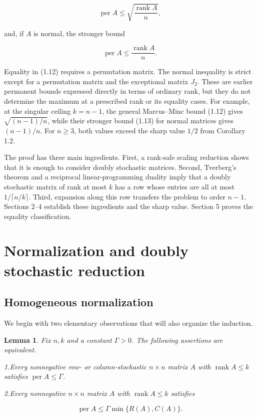 \documentclass[11pt]{article}
\newtheorem{lemma}[theorem]{Lemma}
\theoremstyle{remark}
\begin{document}
\[
 \operatorname{per}A\leq
 \sqrt{\frac{\operatorname{rank}A}{n}},                    \tag{1.12}
\]

and, if \(A\) is normal, the stronger bound

\[
 \operatorname{per}A\leq\frac{\operatorname{rank}A}{n}.  \tag{1.13}
\]

Equality in (1.12) requires a permutation matrix. The normal inequality is
strict except for a permutation matrix and the exceptional matrix \(J_2\).
These are earlier permanent bounds expressed directly in terms of ordinary
rank, but they do not determine the maximum at a prescribed rank or its
equality cases. For example, at the singular ceiling \(k=n-1\), the general
Marcus--Minc bound (1.12) gives \(\sqrt{(n-1)/n}\), while their stronger
bound (1.13) for normal matrices gives \((n-1)/n\). For \(n\geq3\), both
values exceed the sharp value \(1/2\) from Corollary 1.2.

The proof has three main ingredients. First, a rank-safe scaling reduction
shows that it is enough to consider doubly stochastic matrices. Second,
Tverberg's theorem and a reciprocal linear-programming duality imply that a
doubly stochastic matrix of rank at most \(k\) has a row whose entries are
all at most \(1/\lceil n/k\rceil\). Third, expansion along this row transfers
the problem to order \(n-1\). Sections 2--4 establish these ingredients and
the sharp value. Section 5 proves the equality classification.

\section{Normalization and doubly stochastic reduction}

\subsection{Homogeneous normalization}

We begin with two elementary observations that will also organize the
induction.

\begin{lemma}
Fix \(n,k\) and a constant
\(\Gamma>0\). The following assertions are equivalent.

\par\smallskip
\noindent\textup{1.}\enspace Every nonnegative row- or column-stochastic
\(n\times n\) matrix \(A\) with \(\operatorname{rank}A\leq k\) satisfies
\(\operatorname{per}A\leq\Gamma\).

\par\smallskip
\noindent\textup{2.}\enspace Every nonnegative \(n\times n\) matrix \(A\)
with \(\operatorname{rank}A\leq k\) satisfies

\[
 \operatorname{per}A
 \leq\Gamma\min\{R(A),C(A)\}.                          \tag{2.1}
\]
\end{lemma}
\end{document}
